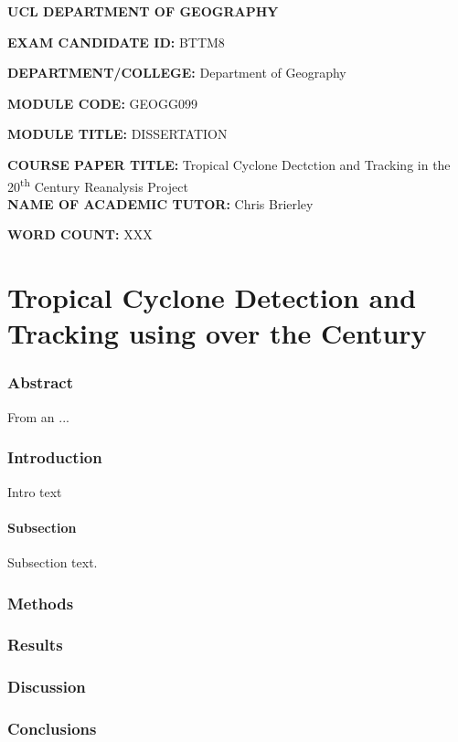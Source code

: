\documentclass{article}
\newcommand{\ts}{\textsuperscript}
\begin{document}
\textbf{UCL DEPARTMENT OF GEOGRAPHY}\\[4cm]

\LARGE

\textbf{EXAM CANDIDATE ID:} BTTM8

\textbf{DEPARTMENT/COLLEGE:} Department of Geography

\textbf{MODULE CODE:} GEOGG099

\textbf{MODULE TITLE:} DISSERTATION

\textbf{COURSE PAPER TITLE:} Tropical Cyclone Dectction and Tracking in the 20\ts{th} Century Reanalysis Project \\[3cm]

\textbf{NAME OF ACADEMIC TUTOR:} Chris Brierley

\textbf{WORD COUNT:} XXX

\normalsize

\newpage


\part*{Tropical Cyclone Detection and Tracking using over the  Century}

\section*{Abstract}

From an ...

\section{Introduction}

Intro text

\subsection{Subsection}

Subsection text.


\section{Methods}


\newpage
\section{Results}






\section{Discussion}


\section{Conclusions}



\end{document}
